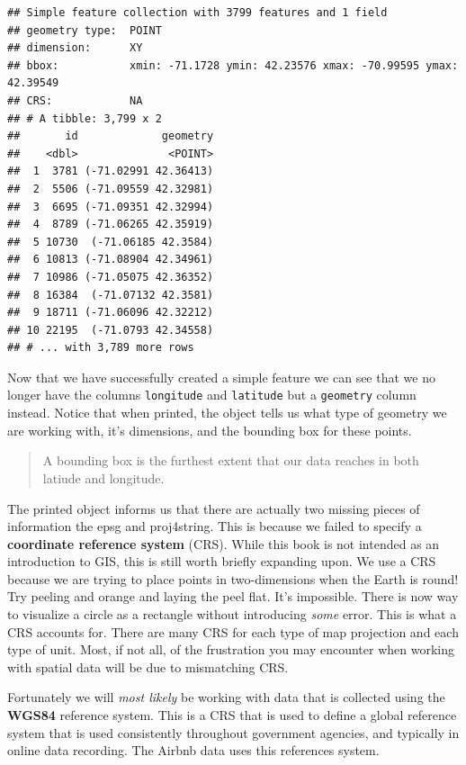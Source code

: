 \documentclass[
]{book}
\begin{document}
\begin{verbatim}
## Simple feature collection with 3799 features and 1 field
## geometry type:  POINT
## dimension:      XY
## bbox:           xmin: -71.1728 ymin: 42.23576 xmax: -70.99595 ymax: 42.39549
## CRS:            NA
## # A tibble: 3,799 x 2
##       id             geometry
##    <dbl>              <POINT>
##  1  3781 (-71.02991 42.36413)
##  2  5506 (-71.09559 42.32981)
##  3  6695 (-71.09351 42.32994)
##  4  8789 (-71.06265 42.35919)
##  5 10730  (-71.06185 42.3584)
##  6 10813 (-71.08904 42.34961)
##  7 10986 (-71.05075 42.36352)
##  8 16384  (-71.07132 42.3581)
##  9 18711 (-71.06096 42.32212)
## 10 22195  (-71.0793 42.34558)
## # ... with 3,789 more rows
\end{verbatim}

Now that we have successfully created a simple feature we can see that we no longer have the columns \texttt{longitude} and \texttt{latitude} but a \texttt{geometry} column instead. Notice that when printed, the object tells us what type of geometry we are working with, it's dimensions, and the bounding box for these points.

\begin{quote}
A bounding box is the furthest extent that our data reaches in both latiude and longitude.
\end{quote}

The printed object informs us that there are actually two missing pieces of information the epsg and proj4string. This is because we failed to specify a \textbf{coordinate reference system} (CRS). While this book is not intended as an introduction to GIS, this is still worth briefly expanding upon. We use a CRS because we are trying to place points in two-dimensions when the Earth is round! Try peeling and orange and laying the peel flat. It's impossible. There is now way to visualize a circle as a rectangle without introducing \emph{some} error. This is what a CRS accounts for. There are many CRS for each type of map projection and each type of unit. Most, if not all, of the frustration you may encounter when working with spatial data will be due to mismatching CRS.

Fortunately we will \emph{most likely} be working with data that is collected using the \textbf{WGS84} reference system. This is a CRS that is used to define a global reference system that is used consistently throughout government agencies, and typically in online data recording. The Airbnb data uses this references system.
\end{document}
